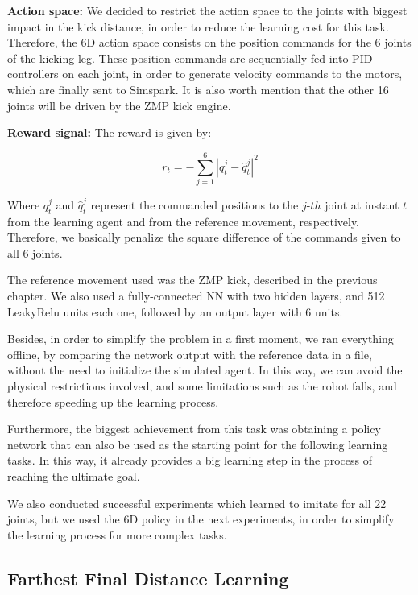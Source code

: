 \textbf{Action space:} We decided to restrict the action space to the joints with biggest impact in the kick distance, in order to reduce the learning cost for this task. Therefore, the 6D action space consists on the position commands for the 6 joints of the kicking leg. These position commands are sequentially fed into PID controllers on each joint, in order to generate velocity commands to the motors, which are finally sent to Simspark. It is also worth mention that the other 16 joints will be driven by the ZMP kick engine.

\textbf{Reward signal:} The reward is given by:

\begin{equation}
r_t = -\sum_{j=1}^{6}{|q_t^j-\hat{q}_t^j|^2}
\end{equation}

Where $q_t^j$ and $\hat{q}_t^j$ represent the commanded positions to the $j$-$th$ joint at instant $t$ from the learning agent and from the reference movement, respectively. Therefore, we basically penalize the square difference of the commands given to all 6 joints.

The reference movement used was the ZMP kick, described in the previous chapter. We also used a fully-connected NN with two hidden layers, and 512 LeakyRelu units each one, followed by an output layer with 6 units.

Besides, in order to simplify the problem in a first moment, we ran everything offline, by comparing the network output with the reference data in a file, without the need to initialize the simulated agent. In this way, we can avoid the physical restrictions involved, and some limitations such as the robot falls, and therefore speeding up the learning process.

Furthermore, the biggest achievement from this task was obtaining a policy network that can also be used as the starting point for the following learning tasks. In this way, it already provides a big learning step in the process of reaching the ultimate goal.

We also conducted successful experiments which learned to imitate for all 22 joints, but we used the 6D policy in the next experiments, in order to simplify the learning process for more complex tasks.

\subsection{Farthest Final Distance Learning}
\label{sec:far_kick_description}

